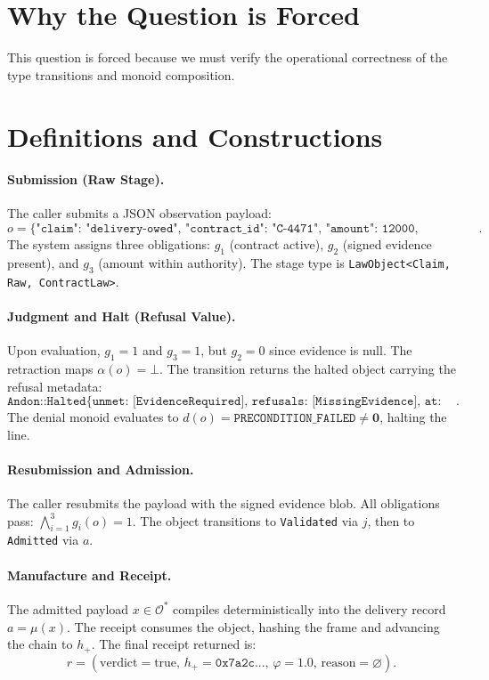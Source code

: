 \documentclass[11pt,oneside]{book}
\theoremstyle{definition}
\theoremstyle{plain}
\theoremstyle{remark}
\newcommand{\Obs}{\mathcal{O}}                 %
\newcommand{\muop}{\mu}                        %
\newcommand{\adm}{\alpha}                      %
\newcommand{\Rfsl}{\bot}                        %
\newcommand{\Fitness}{\varphi}
\newcommand{\code}[1]{\texttt{#1}}
\begin{document}
\section{Why the Question is Forced}
This question is forced because we must verify the operational correctness of the type transitions and monoid composition. %

\section{Definitions and Constructions}

\paragraph{Submission (Raw Stage).}
The caller submits a JSON observation payload:
\[
o = \code{\{ "claim": "delivery-owed", "contract\_id": "C-4471", "amount": 12000, "evidence": null \}}.
\] %
The system assigns three obligations: $g_1$ (contract active), $g_2$ (signed evidence present), and $g_3$ (amount within authority). %
The stage type is \code{LawObject<Claim, Raw, ContractLaw>}. %

\paragraph{Judgment and Halt (Refusal Value).}
Upon evaluation, $g_1 = 1$ and $g_3 = 1$, but $g_2 = 0$ since evidence is null. %
The retraction maps $\adm(o) = \Rfsl$. %
The transition returns the halted object carrying the refusal metadata:
\[
\code{Andon::Halted\{ unmet: [EvidenceRequired], refusals: [MissingEvidence], at: 17188100 \}}.
\] %
The denial monoid evaluates to $d(o) = \code{PRECONDITION\_FAILED} \neq \mathbf{0}$, halting the line. %

\paragraph{Resubmission and Admission.}
The caller resubmits the payload with the signed evidence blob. %
All obligations pass: $\bigwedge_{i=1}^3 g_i(o) = 1$. %
The object transitions to \code{Validated} via $j$, then to \code{Admitted} via $a$. %

\paragraph{Manufacture and Receipt.}
The admitted payload $x \in \Obs^*$ compiles deterministically into the delivery record $a = \muop(x)$. %
The receipt consumes the object, hashing the frame and advancing the chain to $h_+$. %
The final receipt returned is:
\[
r = (\text{verdict} = \text{true},\, h_+ = \code{0x7a2c...},\, \Fitness = 1.0,\, \text{reason} = \varnothing).
\] %
\end{document}

